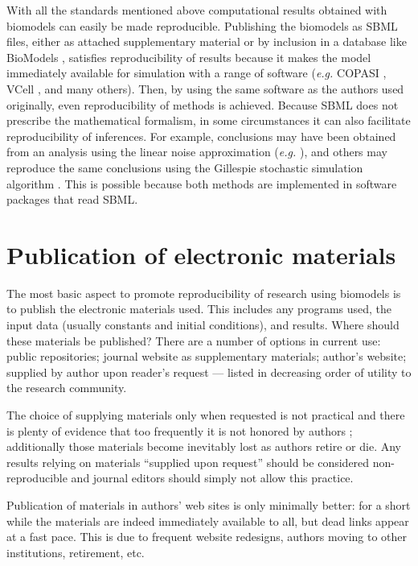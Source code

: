 With all the standards mentioned above computational results obtained with biomodels can easily be made reproducible. Publishing the biomodels as SBML files, either as attached supplementary material or by inclusion in a database like BioModels \cite{chelliah2015},  satisfies reproducibility of results because it makes the model immediately available for simulation with a range of software ({\it e.g.} COPASI \cite{hoops2006}, VCell \cite{moraru2008}, and many others). Then, by using the same software as the authors used originally, even reproducibility of methods is achieved. Because SBML does not prescribe the mathematical formalism, in some circumstances it can also facilitate reproducibility of inferences. For example, conclusions may have been obtained from an analysis using the linear noise approximation ({\it e.g.} \cite{pahle2012}), and others may reproduce the same conclusions using the Gillespie stochastic simulation algorithm \cite{gillespie1976}. This is possible because both  methods are implemented in software packages that read SBML.

\section{Publication of electronic materials}
\label{sec:publication}

The most basic aspect to promote reproducibility of research using biomodels is to publish the electronic materials used. This includes any programs used, the input data (usually constants and initial conditions), and results. Where should these materials be published? There are a number of options in current use: public repositories; journal website as supplementary materials; author's website; supplied by author upon reader's request --- listed in decreasing order of utility to the research community. 

The choice of supplying materials only when requested is not practical and there is plenty of evidence that too frequently it is not honored by authors \cite{stodden2018}; additionally those materials become inevitably lost as authors retire or die. Any results relying on materials ``supplied upon request'' should be considered non-reproducible and journal editors should simply not allow this practice. 

Publication of materials in authors' web sites is only minimally better: for a short while the materials are indeed immediately available to all, but dead links appear at a fast pace. This is due to frequent website redesigns, authors moving to other institutions, retirement, etc. 

